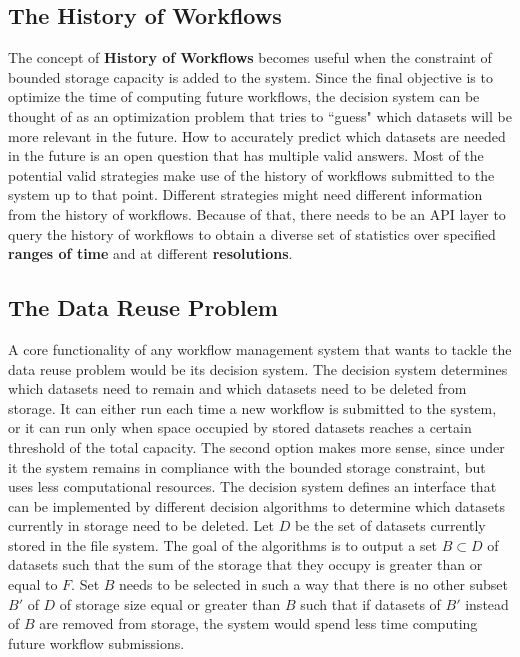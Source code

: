 \subsection{The History of Workflows}
The concept of \textbf{History of Workflows} becomes useful when the constraint of bounded storage capacity is added to the system. Since the final objective is to optimize the time of computing future workflows, the decision system can be thought of as an optimization problem that tries to ``guess" which datasets will be more relevant in the future. How to accurately predict which datasets are needed in the future is an open question that has multiple valid answers. Most of the potential valid strategies make use of the history of workflows submitted to the system up to that point.  Different strategies might need different information from the history of workflows. Because of that, there needs to be an API layer to query the history of workflows to obtain a diverse set of statistics over specified \textbf{ranges of time} and at different \textbf{resolutions}.

\subsection{The Data Reuse Problem}
\label{sec:decision_system}
A core functionality of any workflow management system that wants to tackle the data reuse problem would be its decision system.  The decision system determines which datasets need to remain and which datasets need to be deleted from storage.  It can either run each time a new workflow is submitted to the system, or it can run only when space occupied by stored datasets reaches a certain threshold of the total capacity.  The second option makes more sense, since under it the system remains in compliance with the bounded storage constraint, but uses less computational resources. The decision system defines an interface that can be implemented by different decision algorithms to determine which datasets currently in storage need to be deleted. Let $D$ be the set of datasets currently stored in the file system. The goal of the algorithms is to output a set $B \subset D$ of datasets such that the sum of the storage that they occupy is greater than or equal to $F$.  Set $B$ needs to be selected in such a way that there is no other subset $B'$ of $D$ of storage size equal or greater than $B$ such that if datasets of $B'$ instead of $B$ are removed from storage, the system would spend less time computing future workflow submissions. 

